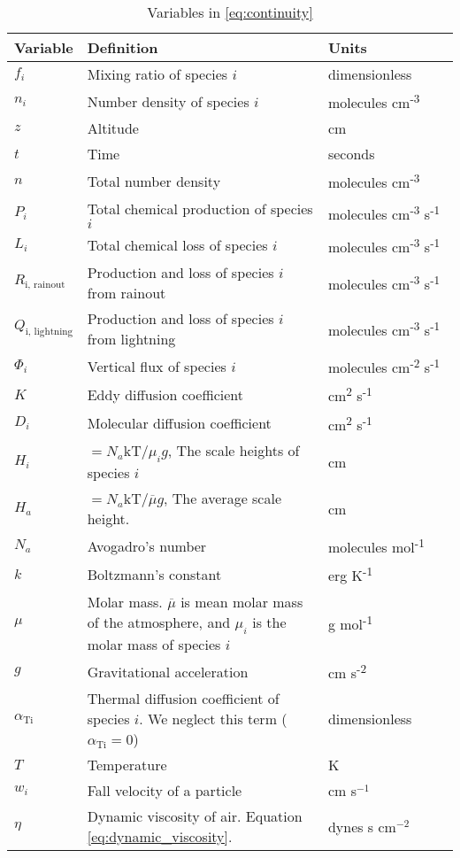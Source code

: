 \documentclass{article}
\begin{document}
\begin{table}
\centering
\begin{tabularx}{\linewidth}{p{0.15\linewidth} | p{0.55\linewidth} | p{0.3\linewidth}}
\hline \hline
Variable & Definition & Units \\
\hline
\(f_{i}\) & Mixing ratio of species \(i\) & dimensionless \\
\(n_{i}\) & Number density of species \(i\) & molecules
cm\textsuperscript{-3} \\
\(z\) & Altitude & cm \\
\(t\) & Time & seconds \\
\(n\) & Total number density & molecules
cm\textsuperscript{-3} \\
\(P_{i}\) & Total chemical production of species \(i\) & molecules
cm\textsuperscript{-3} s\textsuperscript{-1} \\
\(L_{i}\) & Total chemical loss of species \(i\) & molecules
cm\textsuperscript{-3} s\textsuperscript{-1} \\
\(R_{\text{i, rainout}}\) & Production and loss of species \(i\) from
rainout & molecules cm\textsuperscript{-3}
s\textsuperscript{-1} \\
\(Q_{\text{i, lightning}}\) & Production and loss of species \(i\)
from lightning & molecules cm\textsuperscript{-3}
s\textsuperscript{-1} \\
\(\Phi_{i}\) & Vertical flux of species \(i\) & molecules
cm\textsuperscript{-2} s\textsuperscript{-1} \\
\(K\) & Eddy diffusion coefficient & cm\textsuperscript{2}
s\textsuperscript{-1} \\
\(D_{i}\) & Molecular diffusion coefficient & cm\textsuperscript{2}
s\textsuperscript{-1} \\
\(H_{i}\) & \(= N_{a}\text{kT}\text{/}\mu_{i}g\), The scale heights of
species \(i\) & cm \\
\(H_{a}\) & \(= N_{a}\text{kT}\text{/}\overline{\mu}g\), The average
scale height. & cm \\
\(N_{a}\) & Avogadro's number & molecules
mol\textsuperscript{-1} \\
\(k\) & Boltzmann's constant & erg K\textsuperscript{-1} \\
\(\mu\) & Molar mass. \(\overline{\mu}\) is mean molar mass of the
atmosphere, and \(\mu_{i}\) is the molar mass of species \(i\) & g
mol\textsuperscript{-1} \\
\(g\) & Gravitational acceleration & cm
s\textsuperscript{-2} \\
\(\alpha_{\text{Ti}}\) & Thermal diffusion coefficient of species \(i\).
We neglect this term (\(\alpha_{\text{Ti}} = 0\)) &
dimensionless \\
\(T\) & Temperature & K \\
$w_i$ & Fall velocity of a particle & cm s$^{-1}$ \\
$\eta$ & Dynamic viscosity of air. Equation \eqref{eq:dynamic_viscosity}. & dynes s cm$^{-2}$ \\
\end{tabularx}
\caption{Variables in \eqref{eq:continuity}}
\label{tab:variables}
\end{table}
\end{document}
